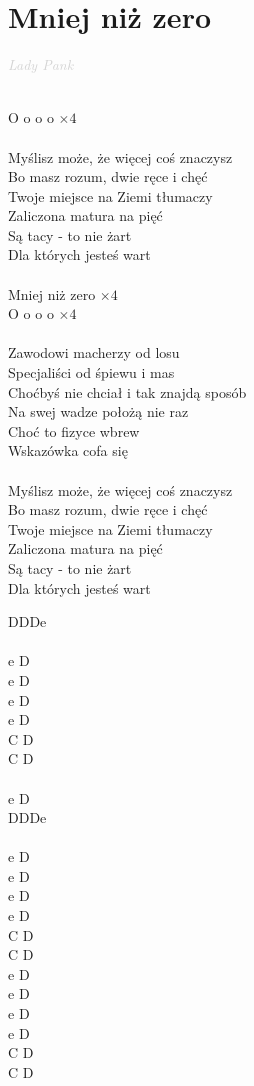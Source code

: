 \documentclass[a5paper, 10pt]{book}
\begin{document}
\section{Mniej niż zero}\textcolor{lightgray}{\textit{Lady Pank}}\\~\\
\begin{minipage}[t]{0.8\textwidth}
O o o o $\times 4$\\
\\
Myślisz może, że więcej coś znaczysz\\
Bo masz rozum, dwie ręce i chęć\\
Twoje miejsce na Ziemi tłumaczy\\
Zaliczona matura na pięć\\
Są tacy - to nie żart\\
Dla których jesteś wart\\
\\
Mniej niż zero $\times 4$\\
O o o o $\times 4$\\
\\
Zawodowi macherzy od losu\\
Specjaliści od śpiewu i mas\\
Choćbyś nie chciał i tak znajdą sposób\\
Na swej wadze położą nie raz\\
Choć to fizyce wbrew\\
Wskazówka cofa się\\
\\
Myślisz może, że więcej coś znaczysz\\
Bo masz rozum, dwie ręce i chęć\\
Twoje miejsce na Ziemi tłumaczy\\
Zaliczona matura na pięć\\
Są tacy - to nie żart\\
Dla których jesteś wart\\
\end{minipage}
\begin{minipage}[t]{0.2\textwidth}
DDDe\\~\\e D\\e D\\e D\\e D\\C D\\C D\\
~\\e D\\
DDDe\\~\\
e D\\e D\\e D\\e D\\C D\\C D\\

e D\\e D\\e D\\e D\\C D\\C D\\
\end{minipage}
\end{document}
